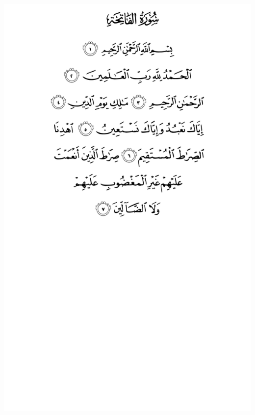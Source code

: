 \documentclass[10pt]{article}
\begin{document}
\pagestyle{fancy}

\lhead{}\chead{}\rhead{}

\lfoot{}
\cfoot{\textarabic{\thepage}}
\rfoot{}

\renewcommand{\headrulewidth}{0.4pt}
\renewcommand{\footrulewidth}{0pt}

\begin{center}
\includegraphics[width=\textwidth,height=\textheight,keepaspectratio]{images/001.png}\newpage
{}

\end{center}
\end{document}
